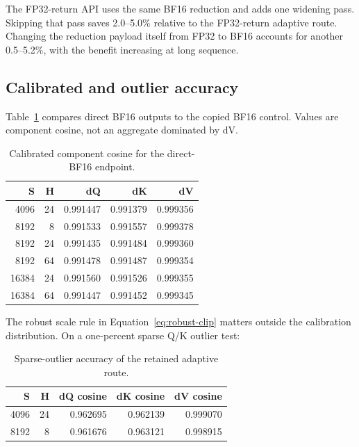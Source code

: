 The FP32-return API uses the same BF16 reduction and adds one widening pass.
Skipping that pass saves 2.0--5.0\% relative to the FP32-return adaptive route.
Changing the reduction payload itself from FP32 to BF16 accounts for another
0.5--5.2\%, with the benefit increasing at long sequence.

\subsection{Calibrated and outlier accuracy}

Table~\ref{tab:direct-bf16-quality} compares direct BF16 outputs to the copied
BF16 control.  Values are component cosine, not an aggregate dominated by dV.

\begin{table}[htbp]
\centering
\caption{Calibrated component cosine for the direct-BF16 endpoint.}
\label{tab:direct-bf16-quality}
\small
\begin{tabular}{rr rrr}
\toprule
S & H & dQ & dK & dV \\
\midrule
4096  & 24 & 0.991447 & 0.991379 & 0.999356 \\
8192  & 8  & 0.991533 & 0.991557 & 0.999378 \\
8192  & 24 & 0.991435 & 0.991484 & 0.999360 \\
8192  & 64 & 0.991478 & 0.991487 & 0.999354 \\
16384 & 24 & 0.991560 & 0.991526 & 0.999355 \\
16384 & 64 & 0.991447 & 0.991452 & 0.999345 \\
\bottomrule
\end{tabular}
\end{table}

The robust scale rule in Equation~\ref{eq:robust-clip} matters outside the
calibration distribution.  On a one-percent sparse Q/K outlier test:

\begin{table}[htbp]
\centering
\caption{Sparse-outlier accuracy of the retained adaptive route.}
\label{tab:outlier-quality}
\small
\begin{tabular}{rr rrr}
\toprule
S & H & dQ cosine & dK cosine & dV cosine \\
\midrule
4096 & 24 & 0.962695 & 0.962139 & 0.999070 \\
8192 & 8  & 0.961676 & 0.963121 & 0.998915 \\
\bottomrule
\end{tabular}
\end{table}

